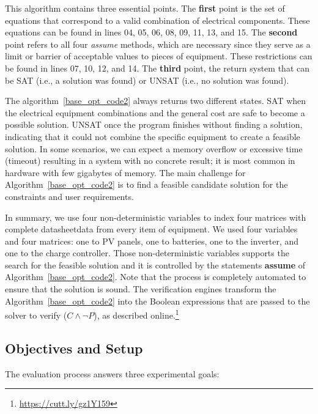 \documentclass[review]{elsarticle}
\begin{document}
This algorithm contains three essential points. The \textbf{first} point is the set of equations that correspond to a valid combination of electrical components. These equations can be found in lines 04, 05, 06, 08, 09, 11, 13, and 15. The \textbf{second} point refers to all four \textit{assume} methods, which are necessary since they serve as a limit or barrier of acceptable values to pieces of equipment. These restrictions can be found in lines 07, 10, 12, and 14. The \textbf{third} point, the return system that can be SAT (i.e., a solution was found) or UNSAT (i.e., no solution was found).

The algorithm~\ref{base_opt_code2} always returns two different states. SAT when the electrical equipment combinations and the general cost are safe to become a possible solution.  UNSAT once the program finishes without finding a solution, indicating that it could not combine the specific equipment to create a feasible solution. In some scenarios, we can expect a memory overflow or excessive time (timeout) resulting in a system with no concrete result; it is most common in hardware with few gigabytes of memory. The main challenge for Algorithm~\ref{base_opt_code2} is to find a feasible candidate solution for the constraints and user requirements.

In summary, we use four non-deterministic variables to index four matrices with complete datasheet\footnotemark[\value{footnote}] data from every item of equipment. We used four variables and four matrices: one to PV panels, one to batteries, one to the inverter, and one to the charge controller. Those non-deterministic variables supports the search for the feasible solution and it is controlled by the statements \textbf{assume} of Algorithm~\ref{base_opt_code2}. Note that the process is completely automated to ensure that the solution is sound. The verification engines transform the Algorithm~\ref{base_opt_code2} into the Boolean expressions that are passed to the solver to verify ($C \wedge \neg P$), as described online.\footnote{\href{https://cutt.ly/gz1Y159}{https://cutt.ly/gz1Y159}}

\subsection{Objectives and Setup}
\label{ObjectivesAndSetup}

The evaluation process answers three experimental goals:
\end{document}
